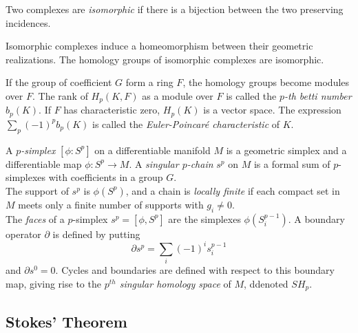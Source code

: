 \begin{defn}

Two complexes are \textit{isomorphic} if there is a bijection between the two preserving incidences.

\end{defn}

\begin{prop}

Isomorphic complexes induce a homeomorphism between their geometric realizations. The homology groups of isomorphic complexes are isomorphic.

\end{prop}

\begin{defn}

	If the group of coefficient $G$ form a ring $F$, the homology groups become modules over $F$. The rank of $H_p(K,F)$ as a module over $F$ is called the \textit{$p$-th betti number} $b_p(K)$. If $F$ has characteristic zero, $H_p(K)$ is a vector space. The expression $\sum_p (-1)^p b_p(K)$ is called the \textit{Euler-Poincar\'e characteristic} of $K$.

\end{defn}

\begin{defn}

A \textit{$p$-simplex} $ \left[ \phi: S^p \right]$ on a differentiable manifold $M$ is a geometric simplex and a differentiable map $ \phi: S^p \to M$. A \textit{singular $p$-chain} $s^p$ on $M$ is a formal sum of $p$-simplexes with coefficients in a group $G$. \\
The support of $s^p$ is $ \phi \left( S^p \right)$, and a chain is \textit{locally finite} if each compact set in $M$ meets only a finite number of supports with $g_i \neq 0$. \\
The \textit{faces} of a $p$-simplex $s^p = \left[ \phi,S^p \right]$ are the simplexes $ \phi \left( S^{ p-1 }_i \right)$. A boundary operator $ \partial$ is defined by putting
\[
	\partial s^p = \sum_i (-1)^i s^{ p-1 }_i
\]
and $ \partial s^0 = 0$. Cycles and boundaries are defined with respect to this boundary map, giving rise to the \textit{$p^{ th }$ singular homology space} of $M$, ddenoted $SH_p$.

\end{defn}

\subsection{Stokes' Theorem}

